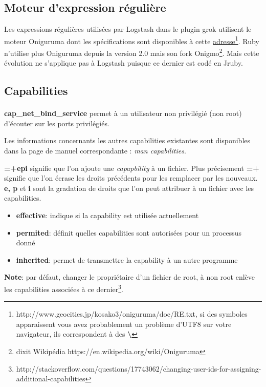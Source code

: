 \subsection{Moteur d'expression régulière}
\label{subsec:logstashregexengine}
Les expressions régulières utilisées par Logstash dans le plugin grok utilisent le 
moteur Oniguruma dont les spécifications sont disponibles à cette 
\href{http://www.geocities.jp/kosako3/oniguruma/doc/RE.txt}{adresse}\footnote{http://www.geocities.jp/kosako3/oniguruma/doc/RE.txt, 
si des symboles \textbf{ \textyen} apparaissent vous avez probablement un problème d'UTF8 sur 
votre navigateur, ils correspondent à des \textbf{ \textbackslash}}.
Ruby n'utilise plus Oniguruma depuis la version 2.0 mais son fork Onigmo\footnote{
dixit Wikipédia https://en.wikipedia.org/wiki/Oniguruma}. Mais cette évolution ne
s'applique pas à Logstash puisque ce dernier est codé en Jruby.

\subsection{Capabilities}
\paragraph{}
\label{subsec:logstashcapabilities}
\textbf{cap\_net\_bind\_service} permet à un utilisateur non privilégié (non root) 
d'écouter sur les ports privilégiés.

Les informations concernants les autres capabilities existantes sont disponibles dans
la page de manuel correspondante : \emph{man capabilities}.

\textbf{=+epi} signifie que l'on ajoute une \emph{capapbility} à un fichier. Plus 
précisement \textbf{=+} signifie que l'on écrase les droits précédents pour les remplacer
par les nouveaux. \textbf{e, p} et \textbf{i} sont la gradation de droits que l'on peut 
attribuer à un fichier avec les capabilities. 

\begin{itemize}
    \item \textbf{effective}: indique si la capability est utilisée actuellement
    \item \textbf{permited}: définit quelles capabilities sont autorisées pour un 
    processus donné
    \item \textbf{inherited}: permet de transmettre la capability à un autre programme
\end{itemize}
\textbf{Note}: par défaut, changer le propriétaire d'un fichier de root, à non root enlève
les capabilities associées à ce dernier\footnote{\scriptsize{http://stackoverflow.com/questions/17743062/changing-user-ids-for-assigning-additional-capabilities}}.

